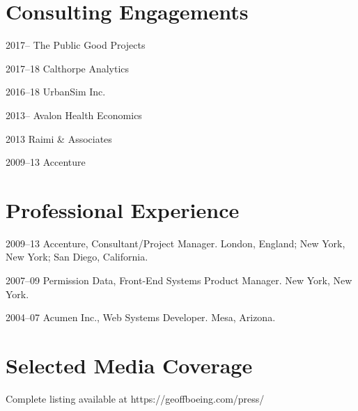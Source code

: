 \documentclass[12pt,letterpaper]{report}
\begin{document}
\section*{Consulting Engagements}

\begin{tablist}

\item[2017--]   \tab The Public Good Projects	

\item[2017--18] \tab Calthorpe Analytics

\item[2016--18] \tab UrbanSim Inc.

\item[2013--]   \tab Avalon Health Economics

\item[2013]     \tab Raimi \& Associates

\item[2009--13] \tab Accenture

\end{tablist}



\section*{Professional Experience}

\begin{tablist}
	
\item[2009--13] \tab Accenture, Consultant/Project Manager. London, England; New York, New York; San Diego, California.

\item[2007--09] \tab Permission Data, Front-End Systems Product Manager. New York, New York.

\item[2004--07] \tab Acumen Inc., Web Systems Developer. Mesa, Arizona.

\end{tablist}



\section*{Selected Media Coverage}

Complete listing available at https://geoffboeing.com/press/ \bigskip
\end{document}
